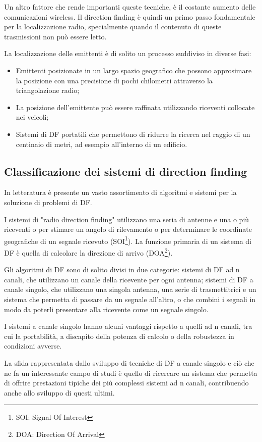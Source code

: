 Un altro fattore che rende importanti queste tecniche, è il costante aumento delle comunicazioni wireless. Il direction finding è quindi un primo passo fondamentale per la localizzazione radio, specialmente quando il contenuto di queste trasmissioni non può essere letto. 

La localizzazione delle emittenti è di solito un processo suddiviso in diverse fasi: 
\begin{itemize}
\item Emittenti posizionate in un largo spazio geografico che possono approsimare la posizione con una precisione di pochi chilometri attraverso la triangolazione radio;
\item La posizione dell'emittente può essere raffinata utilizzando riceventi collocate nei veicoli; 
\item Sistemi di DF portatili che permettono di ridurre la ricerca nel raggio di un centinaio di metri, ad esempio all'interno di un edificio.
\end{itemize}


\subsection{Classificazione dei sistemi di direction finding}

In letteratura è presente un vasto assortimento di algoritmi e sistemi per la soluzione di problemi di DF.

I sistemi di "radio direction finding" utilizzano una seria di antenne e una o più riceventi o per stimare un angolo di rilevamento o per determinare le coordinate geografiche di un segnale ricevuto (SOI\footnote{SOI: Signal Of Interest}). La funzione primaria di un sistema di DF è quella di calcolare la direzione di arrivo (DOA\footnote{DOA: Direction Of Arrival}). 

Gli algoritmi di DF sono di solito divisi in due categorie: sistemi di DF ad n canali, che utilizzano un canale della ricevente per ogni antenna; sistemi di DF a canale singolo, che utilizzano una singola antenna, una serie di trasmettitrici e un sistema che permetta di passare da un segnale all'altro, o che combini i segnali in modo da poterli presentare alla ricevente come un segnale singolo. 

I sistemi a canale singolo hanno alcuni vantaggi rispetto a quelli ad n canali, tra cui la portabilità, a discapito della potenza di calcolo o della robustezza in condizioni avverse. 

La sfida rappresentata dallo sviluppo di tecniche di DF a canale singolo e ciò che ne fa un interessante campo di studi è quello di ricercare un sistema che permetta di offrire prestazioni tipiche dei più complessi sistemi ad n canali, contribuendo anche allo sviluppo di questi ultimi.

